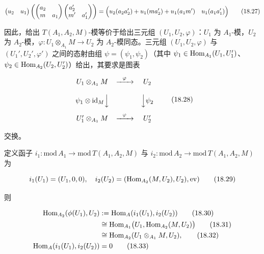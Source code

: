 \begin{equation}
  \begin{pmatrix} u_2 & u_1 \end{pmatrix}
  \left(
  \begin{pmatrix} a_2 & \\ m & a_1 \end{pmatrix}
  \begin{pmatrix} a_2' & \\ m' & a_1' \end{pmatrix}
  \right)
  =
  \Bigl(
  u_2(a_2a_2') + u_1(ma_2') + u_1(a_1m')
  \quad
  u_1(a_1a_1')
  \Bigr) \tag{18.27}
\end{equation}

因此，给出 $T(A_1,A_2,M)$-模等价于给出三元组 $(U_1,U_2,\varphi)$：$U_1$ 为 $A_1$-模，$U_2$ 为 $A_2$-模，$\varphi\colon U_1\otimes_{A_1}M\to U_2$ 为 $A_2$-模同态。三元组 $(U_1,U_2,\varphi)$ 与 $(U_1',U_2',\varphi')$ 之间的态射由组 $\psi=(\psi_1,\psi_2)$（其中 $\psi_1\in\operatorname{Hom}_{A_1}(U_1,U_1')$、$\psi_2\in\operatorname{Hom}_{A_2}(U_2,U_2')$）给出，其要求是图表

\begin{equation}
  \begin{array}{c@{\quad}c@{\quad}c}
    U_1\otimes_{A_1}M & \xrightarrow{\ \ \varphi\ \ } & U_2\\[2.6ex]
    \psi_1\otimes\id_M\Big\downarrow & & \Big\downarrow\psi_2\\[2.6ex]
    U_1'\otimes_{A_1}M & \xrightarrow{\ \ \varphi\ \ } & U_2'
  \end{array} \tag{18.28}
\end{equation}

交换。

定义函子 $i_1\colon\mathrm{mod}\,A_1\to\mathrm{mod}\,T(A_1,A_2,M)$ 与 $i_2\colon\mathrm{mod}\,A_2\to\mathrm{mod}\,T(A_1,A_2,M)$ 为

\begin{equation}
  i_1(U_1) = (U_1,0,0),\quad
  i_2(U_2) = (\operatorname{Hom}_{A_2}(M,U_2),U_2),\mathrm{ev}) \tag{18.29}
\end{equation}

则

\begin{align}
  \operatorname{Hom}_{A_2}(\phi(U_1),U_2) &:= \operatorname{Hom}_{A}(i_1(U_1),i_2(U_2)) \tag{18.30}\\
  &\cong \operatorname{Hom}_{A_1}\bigl(U_1,\operatorname{Hom}_{A_2}(M,U_2)\bigr) \tag{18.31}\\
  &\cong \operatorname{Hom}_{A_2}(U_1\otimes_{A_1}M,U_2), \tag{18.32}\\
  \operatorname{Hom}_{A}(i_1(U_1),i_2(U_2)) &= 0 \tag{18.33}
\end{align}

